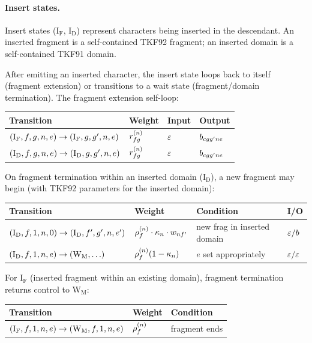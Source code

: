 \paragraph{Insert states.}
Insert states ($\mathrm{I_F}$, $\mathrm{I_D}$) represent characters being inserted
in the descendant.  An inserted fragment is a self-contained TKF92 fragment;
an inserted domain is a self-contained TKF91 domain.

After emitting an inserted character, the insert state loops back to itself
(fragment extension) or transitions to a wait state (fragment/domain termination).
The fragment extension self-loop:
\begin{center}
\renewcommand{\arraystretch}{1.3}
\begin{tabular}{llll}
\hline
Transition & Weight & Input & Output \\
\hline
$(\mathrm{I_F}, f, g, n, e) \to (\mathrm{I_F}, g, g', n, e)$ &
  $r^{(n)}_{fg}$ & $\varepsilon$ & $b_{cg g'n e}$ \\
$(\mathrm{I_D}, f, g, n, e) \to (\mathrm{I_D}, g, g', n, e)$ &
  $r^{(n)}_{fg}$ & $\varepsilon$ & $b_{cg g'n e}$ \\
\hline
\end{tabular}
\end{center}

On fragment termination within an inserted domain ($\mathrm{I_D}$), a new fragment
may begin (with TKF92 parameters for the inserted domain):
\begin{center}
\renewcommand{\arraystretch}{1.3}
\begin{tabular}{llll}
\hline
Transition & Weight & Condition & I/O \\
\hline
$(\mathrm{I_D}, f, 1, n, 0) \to (\mathrm{I_D}, f', g', n, e')$ &
  $\rho^{(n)}_f \cdot \kappa_n \cdot w_{nf'}$ &
  new frag in inserted domain &
  $\varepsilon / b$ \\
$(\mathrm{I_D}, f, 1, n, e) \to (\mathrm{W_M}, \ldots)$ &
  $\rho^{(n)}_f(1-\kappa_n)$ &
  $e$ set appropriately &
  $\varepsilon / \varepsilon$ \\
\hline
\end{tabular}
\end{center}

For $\mathrm{I_F}$ (inserted fragment within an existing domain), fragment termination
returns control to $\mathrm{W_M}$:
\begin{center}
\renewcommand{\arraystretch}{1.3}
\begin{tabular}{lll}
\hline
Transition & Weight & Condition \\
\hline
$(\mathrm{I_F}, f, 1, n, e) \to (\mathrm{W_M}, f, 1, n, e)$ &
  $\rho^{(n)}_f$ & fragment ends \\
\hline
\end{tabular}
\end{center}


